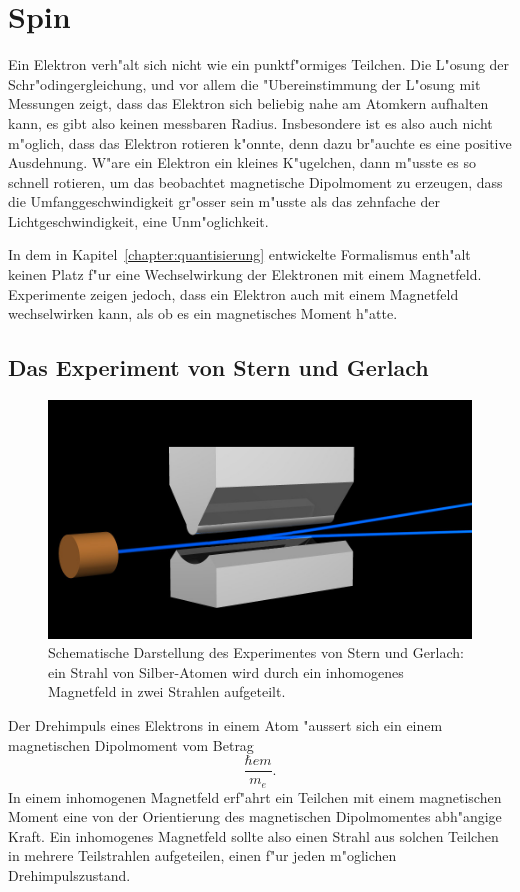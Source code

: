 \chapter{Spin\label{chapter:spin}}
\rhead{}
%
Ein Elektron verh"alt sich nicht wie ein punktf"ormiges Teilchen.
Die L"osung der Schr"odingergleichung, und vor allem die "Ubereinstimmung
der L"osung mit Messungen zeigt, dass das Elektron sich beliebig nahe 
am Atomkern aufhalten kann, es gibt also keinen messbaren Radius.
Insbesondere ist es also auch nicht m"oglich, dass das Elektron
rotieren k"onnte, denn dazu br"auchte es eine positive Ausdehnung.
W"are ein Elektron ein kleines K"ugelchen, dann m"usste es so schnell
rotieren, um das beobachtet magnetische Dipolmoment zu erzeugen, dass
die Umfanggeschwindigkeit gr"osser sein m"usste als das zehnfache
der Lichtgeschwindigkeit, eine Unm"oglichkeit.

In dem in Kapitel~\ref{chapter:quantisierung} entwickelte Formalismus
enth"alt keinen Platz f"ur eine Wechselwirkung der Elektronen
mit einem Magnetfeld.
Experimente zeigen jedoch, dass ein Elektron auch mit einem Magnetfeld
wechselwirken kann, als ob es ein magnetisches Moment h"atte. 

\section{Das Experiment von Stern und Gerlach}
%
%
\begin{figure}
\centering
\includegraphics[width=\hsize]{graphics/sterngerlach.jpg}
\caption{Schematische Darstellung des Experimentes von Stern und
Gerlach: ein Strahl von Silber-Atomen wird durch ein inhomogenes
Magnetfeld in zwei Strahlen aufgeteilt.
\label{skript:sterngerlachimage}}
\end{figure}
Der Drehimpuls eines Elektrons in einem Atom "aussert sich ein einem
magnetischen Dipolmoment vom Betrag
\[
\frac{\hbar em}{m_e}.
\]
In einem inhomogenen Magnetfeld erf"ahrt ein Teilchen mit einem magnetischen
Moment eine von der Orientierung des magnetischen Dipolmomentes 
abh"angige Kraft.
Ein inhomogenes Magnetfeld sollte also
einen Strahl aus solchen Teilchen in mehrere Teilstrahlen
aufgeteilen, einen f"ur jeden m"oglichen Drehimpulszustand.

